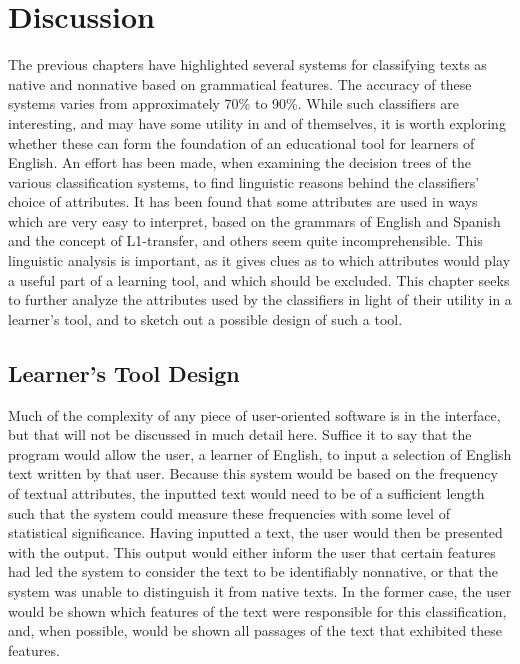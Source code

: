 \documentclass[main.tex]{subfiles}
\begin{document}
\section{Discussion}

The previous chapters have highlighted several systems for classifying texts as native and nonnative based on grammatical features. The accuracy of these systems varies from approximately 70\% to 90\%. While such classifiers are interesting, and may have some utility in and of themselves, it is worth exploring whether these can form the foundation of an educational tool for learners of English. An effort has been made, when examining the decision trees of the various classification systems, to find linguistic reasons behind the classifiers' choice of attributes. It has been found that some attributes are used in ways which are very easy to interpret, based on the grammars of English and Spanish and the concept of L1-transfer, and others seem quite incomprehensible. This linguistic analysis is important, as it gives clues as to which attributes would play a useful part of a learning tool, and which should be excluded. This chapter seeks to further analyze the attributes used by the classifiers in light of their utility in a learner's tool, and to sketch out a possible design of such a tool. 

\subsection{Learner's Tool Design}

Much of the complexity of any piece of user-oriented software is in the interface, but that will not be discussed in much detail here. Suffice it to say that the program would allow the user, a learner of English, to input a selection of English text written by that user. Because this system would be based on the frequency of textual attributes, the inputted text would need to be of a sufficient length such that the system could measure these frequencies with some level of statistical significance. Having inputted a text, the user would then be presented with the output. This output would either inform the user that certain features had led the system to consider the text to be identifiably nonnative, or that the system was unable to distinguish it from native texts. In the former case, the user would be shown which features of the text were responsible for this classification, and, when possible, would be shown all passages of the text that exhibited these features.
\end{document}
